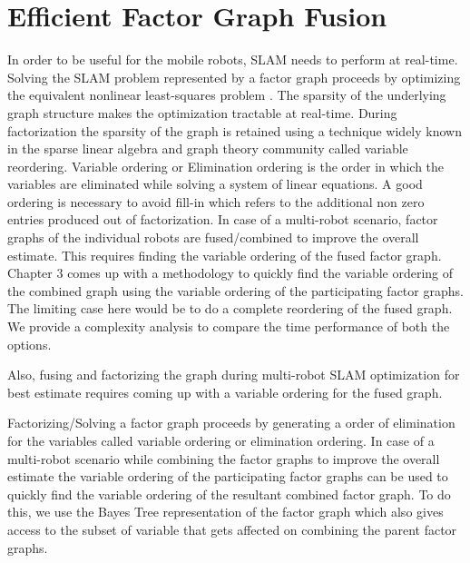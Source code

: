 \chapter{Efficient Factor Graph Fusion}

In order to be useful for the mobile robots, SLAM needs to perform at real-time. Solving the SLAM problem represented by a factor graph proceeds by optimizing the equivalent nonlinear least-squares problem \cite{lumiliosfirstgraphslam}. The sparsity of the underlying graph structure makes the optimization tractable at real-time. During factorization the sparsity of the graph is retained using a technique widely known in the sparse linear algebra and graph theory community called variable reordering. Variable ordering or Elimination ordering is the order in which the variables are eliminated while solving a system of linear equations. A good ordering is necessary to avoid fill-in which refers to the additional non zero entries produced out of factorization. In case of a multi-robot scenario, factor graphs of the individual robots are fused/combined to improve the overall estimate. This requires finding the variable ordering of the fused factor graph. 
Chapter 3 comes up with a methodology to quickly find the variable ordering of the combined graph using the variable ordering of the participating factor graphs. The limiting case here would be to do a complete reordering of the fused graph. We provide a complexity analysis to compare the time performance of both the options. 

Also, fusing and factorizing the graph during multi-robot SLAM optimization for best estimate requires coming up with a variable ordering for the fused graph. 

Factorizing/Solving a factor graph proceeds by generating a order of elimination for the variables called variable ordering or elimination ordering. In case of a multi-robot scenario while combining the factor graphs to improve the overall estimate the variable ordering of the participating factor graphs can be used to quickly find the variable ordering of the resultant combined factor graph. To do this, we use the Bayes Tree \cite{kaessbayestree} representation of the factor graph which also gives access to the subset of variable that gets affected on combining the parent factor graphs. 
